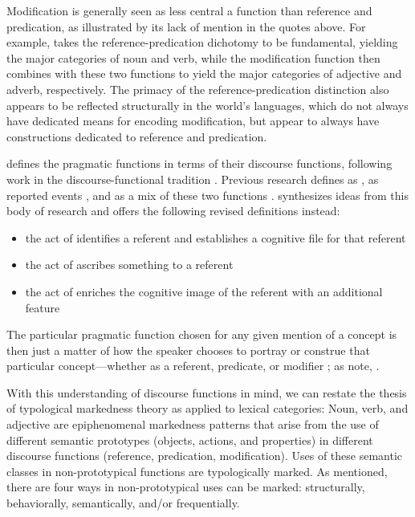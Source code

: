 Modification is generally seen as less central a function than reference and predication, as illustrated by its lack of mention in the quotes above. For example, \textcite[55]{Hengeveld1992} takes the reference-predication dichotomy to be fundamental, yielding the major categories of noun and verb, while the modification function then combines with these two functions to yield the major categories of adjective and adverb, respectively. The primacy of the reference-predication distinction also appears to be reflected structurally in the world's languages, which do not always have dedicated means for encoding modification, but appear to always have constructions dedicated to reference and predication.

\textcite[123]{Croft1991} defines the pragmatic functions in terms of their discourse functions, following work in the discourse-functional tradition \parencites{Chafe1976}{HopperThompson1984}{Chafe1987}{DuBois1987}. Previous research defines  as ,  as reported events \parencite[726]{HopperThompson1984}, and  as a mix of these two functions \parencite{Thompson1989}. \textcite[123]{Croft1991} synthesizes ideas from this body of research and offers the following revised definitions instead:

\begin{itemize}
  \item the act of  identifies a referent and establishes a cognitive file for that referent
  \item the act of  ascribes something to a referent
  \item the act of  enriches the cognitive image of the referent with an additional feature
\end{itemize}

\noindent The particular pragmatic function chosen for any given mention of a concept is then just a matter of how the speaker chooses to portray or construe that particular concept—whether as a referent, predicate, or modifier \parencite[100]{Croft1991}; as \citeauthor{CroftLier2012} note, .

With this understanding of discourse functions in mind, we can restate the thesis of typological markedness theory as applied to lexical categories: Noun, verb, and adjective are epiphenomenal markedness patterns that arise from the use of different semantic prototypes (objects, actions, and properties) in different discourse functions (reference, predication, modification). Uses of these semantic classes in non-prototypical functions are typologically marked. As mentioned, there are four ways in non-prototypical uses can be marked: structurally, behaviorally, semantically, and/or frequentially.

